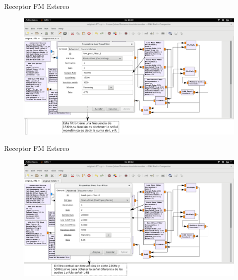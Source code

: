 \begin{frame}{Receptor FM Estereo}

\begin{figure}[H]
\centering
\vspace{-3mm}
\includegraphics[width=\textwidth]{parte3/lab9/pdf/lab9_2.pdf}
\end{figure}

\end{frame}

\begin{frame}{Receptor FM Estereo}

\begin{figure}[H]
\centering
\vspace{-3mm}
\includegraphics[width=\textwidth]{parte3/lab9/pdf/lab9_3.pdf}
\end{figure}

\end{frame}

